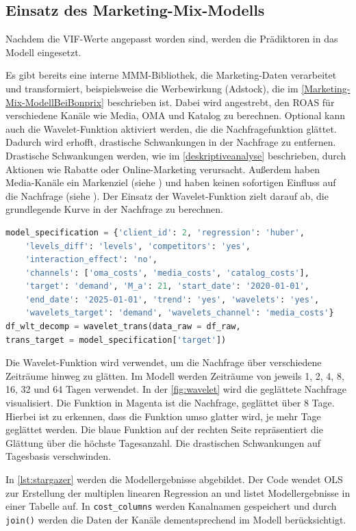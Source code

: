 \subsection{Einsatz des Marketing-Mix-Modells}
\label{EinsatzDesMarketing-Mix-Modells}
Nachdem die \ac{VIF}-Werte angepasst worden sind, werden die Prädiktoren in das Modell eingesetzt. \par
Es gibt bereits eine interne \ac{MMM}-Bibliothek, die Marketing-Daten verarbeitet und transformiert, beispielsweise die Werbewirkung (Adstock), die im \autoref{Marketing-Mix-ModellBeiBonprix} beschrieben ist. Dabei wird angestrebt, den \ac{ROAS} für verschiedene Kanäle wie Media, \ac{OMA} und Katalog zu berechnen. Optional kann auch die Wavelet-Funktion aktiviert werden, die die Nachfragefunktion glättet. Dadurch wird erhofft, drastische Schwankungen in der Nachfrage zu entfernen. Drastische Schwankungen werden, wie im \autoref{deskriptiveanalyse} beschrieben, durch Aktionen wie Rabatte oder Online-Marketing verursacht. Außerdem haben Media-Kanäle ein Markenziel (siehe ) und haben keinen sofortigen Einfluss auf die Nachfrage (siehe ). Der Einsatz der Wavelet-Funktion zielt darauf ab, die grundlegende Kurve in der Nachfrage zu berechnen.  
\begin{lstlisting}[language=Python, linewidth=\textwidth]
model_specification = {'client_id': 2, 'regression': 'huber', 
    'levels_diff': 'levels', 'competitors': 'yes', 
    'interaction_effect': 'no', 
    'channels': ['oma_costs', 'media_costs', 'catalog_costs'],
    'target': 'demand', 'M_a': 21, 'start_date': '2020-01-01', 
    'end_date': '2025-01-01', 'trend': 'yes', 'wavelets': 'yes', 
    'wavelets_target': 'demand', 'wavelets_channel': 'media_costs'}
df_wlt_decomp = wavelet_trans(data_raw = df_raw, 
trans_target = model_specification['target'])
\end{lstlisting}
Die Wavelet-Funktion wird verwendet, um die Nachfrage über verschiedene Zeiträume hinweg zu glätten. Im Modell werden Zeiträume von jeweils 1, 2, 4, 8, 16, 32 und 64 Tagen verwendet. In der \autoref{fig:wavelet} wird die geglättete Nachfrage visualisiert. Die Funktion in Magenta ist die Nachfrage, geglättet über 8 Tage. Hierbei ist zu erkennen, dass die Funktion umso glatter wird, je mehr Tage geglättet werden. Die blaue Funktion auf der rechten Seite repräsentiert die Glättung über die höchste Tagesanzahl. Die drastischen Schwankungen auf Tagesbasis verschwinden. \par
In \autoref{lst:stargazer} werden die Modellergebnisse abgebildet. Der Code wendet \ac{OLS} zur Erstellung der multiplen linearen Regression an und listet Modellergebnisse in einer Tabelle auf. In \verb|cost_columns| werden Kanalnamen gespeichert und durch \verb|join()| werden die Daten der Kanäle dementsprechend im Modell berücksichtigt. 
